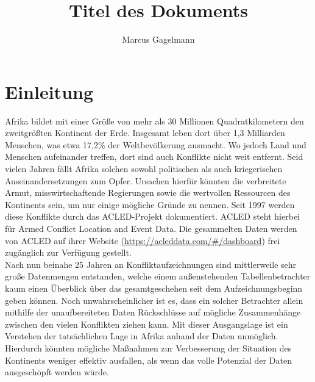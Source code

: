 \documentclass[usegeometry=true]{scrartcl}
\begin{document}
\subject{Projektbericht zum Modul Information Retrieval und Visualisierung Sommersemester 2021}
\title{Titel des Dokuments}
\author{Marcus Gagelmann}%
\maketitle%

\section{Einleitung}
Afrika bildet mit einer Größe von mehr als 30 Millionen Quadratkilometern den zweitgrößten Kontinent der Erde. Insgesamt leben dort über 1,3 Milliarden Menschen, was etwa 17,2\% der Weltbevölkerung ausmacht. Wo jedoch Land und Menschen aufeinander treffen, dort sind auch Konflikte nicht weit entfernt. Seid vielen Jahren fällt Afrika solchen sowohl politischen als auch kriegerischen Auseinandersetzungen zum Opfer. Ursachen hierfür könnten die verbreitete Armut, misswirtschaftende Regierungen sowie die wertvollen Ressourcen des Kontinents sein, um nur einige mögliche Gründe zu nennen. Seit 1997 werden diese Konflikte durch das ACLED-Projekt dokumentiert. ACLED steht hierbei für \glqq Armed Conflict Location and Event Data\grqq. Die gesammelten Daten werden von ACLED auf ihrer Website (\url{https://acleddata.com/#/dashboard}) frei zugänglich zur Verfügung gestellt.\\

Nach nun beinahe 25 Jahren an Konfliktaufzeichnungen sind mittlerweile sehr große Datenmengen entstanden, welche einem außenstehenden Tabellenbetrachter kaum einen Überblick über das gesamtgeschehen seit dem Aufzeichnungsbeginn geben können. Noch unwahrscheinlicher ist es, dass ein solcher Betrachter allein mithilfe der unaufbereiteten Daten Rückschlüsse auf mögliche Zusammenhänge zwischen den vielen Konflikten ziehen kann. Mit dieser Ausgangslage ist ein Verstehen der tatsächlichen Lage in Afrika anhand der Daten unmöglich. Hierdurch könnten mögliche Maßnahmen zur Verbesserung der Situation des Kontinents weniger effektiv ausfallen, als wenn das volle Potenzial der Daten ausgeschöpft werden würde.\\
\end{document}
